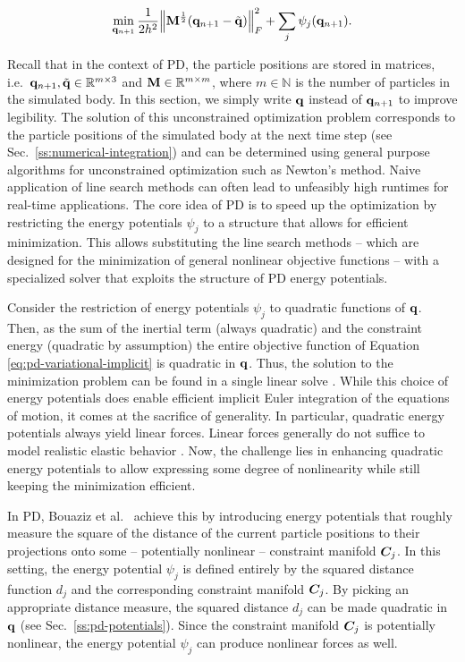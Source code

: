 \begin{equation}\label{eq:pd-variational-implicit}
    \min_{\mathbf{q}_{n+1}} \frac{1}{2h^2} \norm{\mathbf{M}^{\frac{1}{2}}(\mathbf{q}_{n+1} - \tilde{\mathbf{q}})}^2_F + \sum_j \psi_j(\mathbf{q}_{n+1}).
\end{equation}

\noindent Recall that in the context of PD, the particle positions are stored in matrices, i.e.\ $\mathbf{q}_{n+1}, \tilde{\mathbf{q}} \in 
\mathbb{R}^{m \times 3}$ and $\mathbf{M} \in \mathbb{R}^{m \times m}$, where $m \in \mathbb{N}$ is the number of particles in the simulated
body. In this section, we simply write $\mathbf{q}$ instead of $\mathbf{q}_{n+1}$ to improve legibility. The solution of this unconstrained 
optimization problem corresponds to the particle positions of the simulated body at the next time
step (see Sec.\ \ref{ss:numerical-integration}) and can be determined using general purpose algorithms for unconstrained optimization 
such as Newton's method. Naive application of line search methods can often lead to unfeasibly high runtimes for real-time applications. 
The core idea of PD
is to speed up the optimization by restricting the energy potentials $\psi_j$ to a structure that allows for efficient minimization.
This allows substituting the line search methods -- which are designed for the minimization of general nonlinear objective functions 
-- with a specialized solver that exploits the structure of PD energy potentials. 

Consider the restriction of energy potentials $\psi_j$ to quadratic functions of $\mathbf{q}$. Then, as the sum of the inertial term 
(always quadratic) and the constraint energy (quadratic by assumption) the entire objective function of Equation \ref{eq:pd-variational-implicit} 
is quadratic in $\mathbf{q}$. Thus, the solution to the minimization problem can be found in a single linear solve \cite{nocedal2006}. 
While this choice
of energy potentials does enable efficient implicit Euler integration of the equations of motion, it comes at the sacrifice of generality.
In particular, quadratic energy potentials always yield linear forces. Linear forces generally do not suffice to model realistic
elastic behavior \cite{wang2011}. Now, the challenge lies in enhancing quadratic energy potentials to allow expressing some degree
of nonlinearity while still keeping the minimization efficient. 

In PD, Bouaziz et al.\ \cite{bouaziz2014} achieve this by introducing energy potentials that roughly measure the square of the
distance of the current particle positions to their projections onto some -- potentially nonlinear -- constraint manifold $\bm{C}_j$. 
In this setting, the energy potential $\psi_j$ is defined entirely by the squared distance function $d_j$ and the corresponding constraint 
manifold $\bm{C}_j$. By picking an appropriate distance measure, the squared distance $d_j$ can be made quadratic in $\mathbf{q}$ 
(see Sec.\ \ref{ss:pd-potentials}). Since the constraint manifold $\bm{C}_j$ is potentially nonlinear, the energy potential 
$\psi_j$ can produce nonlinear forces as well. 


